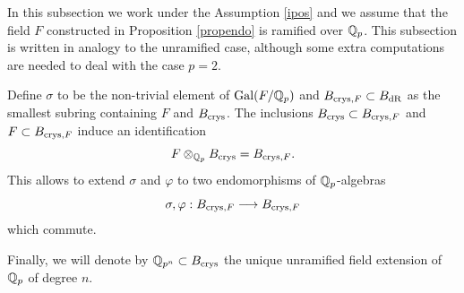 \documentclass[11pt]{amsart}
\begin{document}
In this subsection we work under the Assumption  \ref{ipos} and we assume that the field $F$  constructed in  Proposition \ref{propendo} is ramified over $\mathbb{Q}_p$. This subsection is written in  analogy to the unramified case, although  some extra computations are needed to deal with the case $p=2$.

Define $\sigma$ to be the  non-trivial element of $\textnormal{Gal}(F/\mathbb{Q}_p)$ and $  B_{\textnormal{crys},F} \subset B_{\mathrm{dR}}$ as the smallest subring containing $F$ and  $B_{\textnormal{crys}}$.
The inclusions   $  B_{\textnormal{crys}} \subset B_{\textnormal{crys},F}$ and  $  F \subset B_{\textnormal{crys},F}$ induce an identification
\[F\otimes_{\mathbb{Q}_p} B_{\textnormal{crys}}=B_{\textnormal{crys},F}. \]
This allows to extend $\sigma$ and $\varphi$ to two endomorphisms of $\mathbb{Q}_p$-algebras
\[   \sigma, \varphi : B_{\textnormal{crys},F}    \longrightarrow B_{\textnormal{crys},F} \]
which commute.

Finally, we will denote by $\mathbb{Q}_{p^n}\subset B_{\textnormal{crys}}$ the unique unramified field extension of $\mathbb{Q}_p$ of degree $n$. 
\end{document}
